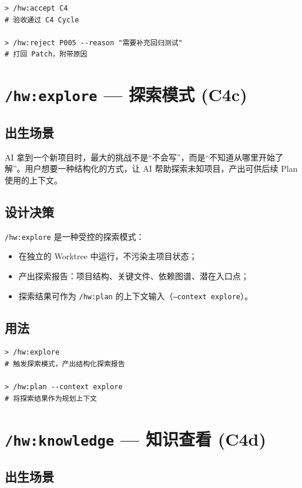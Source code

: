 \documentclass[
  outputdir=build,
  chapterstyle=cn,
  colorscheme=Simple,
  fontset=tech,
  code=false
]{Hypo-Note}
\begin{document}
\begin{lstlisting}[caption=验收 Cycle 或 Patch]
> /hw:accept C4
# 验收通过 C4 Cycle

> /hw:reject P005 --reason "需要补充回归测试"
# 打回 Patch，附带原因
\end{lstlisting}

\section{\texttt{/hw:explore} — 探索模式 (C4c)}

\subsection{出生场景}

AI 拿到一个新项目时，最大的挑战不是“不会写”，而是“不知道从哪里开始了解”。用户想要一种结构化的方式，让 AI 帮助探索未知项目，产出可供后续 Plan 使用的上下文。

\subsection{设计决策}

\texttt{/hw:explore} 是一种受控的探索模式：

\begin{itemize}[leftmargin=2em]
  \item 在独立的 Worktree 中运行，不污染主项目状态；
  \item 产出探索报告：项目结构、关键文件、依赖图谱、潜在入口点；
  \item 探索结果可作为 \texttt{/hw:plan} 的上下文输入（\texttt{--context explore}）。
\end{itemize}

\subsection{用法}

\begin{lstlisting}[caption=探索新项目]
> /hw:explore
# 触发探索模式，产出结构化探索报告

> /hw:plan --context explore
# 将探索结果作为规划上下文
\end{lstlisting}

\section{\texttt{/hw:knowledge} — 知识查看 (C4d)}

\subsection{出生场景}
\end{document}
